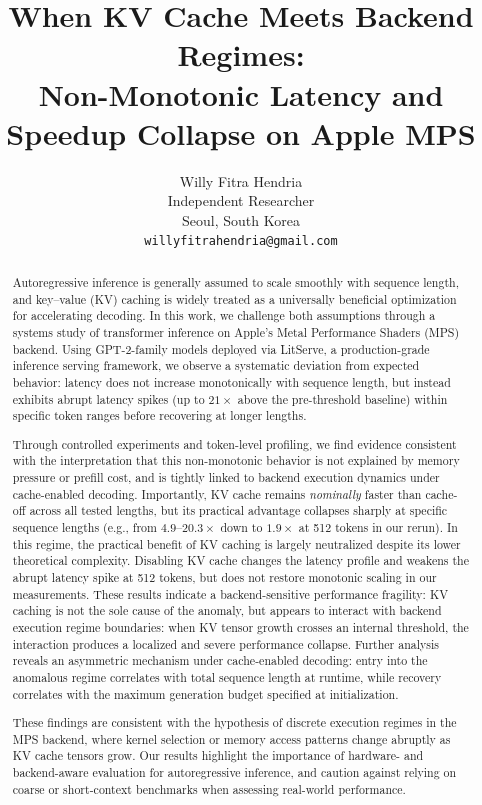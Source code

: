 \documentclass{article}
\title{When KV Cache Meets Backend Regimes: \\ Non-Monotonic Latency and Speedup Collapse on Apple MPS}
\author{
  Willy Fitra Hendria \\
  Independent Researcher \\
  Seoul, South Korea \\
  \texttt{willyfitrahendria@gmail.com}
}
\begin{document}
\maketitle

\begin{abstract}
Autoregressive inference is generally assumed to scale smoothly with sequence length, and key--value (KV) caching is widely treated as a universally beneficial optimization for accelerating decoding. In this work, we challenge both assumptions through a systems study of transformer inference on Apple's Metal Performance Shaders (MPS) backend. Using GPT-2-family models deployed via LitServe, a production-grade inference serving framework, we observe a systematic deviation from expected behavior: latency does not increase monotonically with sequence length, but instead exhibits abrupt latency spikes (up to $21\times$ above the pre-threshold baseline) within specific token ranges before recovering at longer lengths.

Through controlled experiments and token-level profiling, we find evidence consistent with the interpretation that this non-monotonic behavior is not explained by memory pressure or prefill cost, and is tightly linked to backend execution dynamics under cache-enabled decoding. Importantly, KV cache remains \emph{nominally} faster than cache-off across all tested lengths, but its practical advantage collapses sharply at specific sequence lengths (e.g., from $4.9$--$20.3\times$ down to $1.9\times$ at 512 tokens in our rerun). In this regime, the practical benefit of KV caching is largely neutralized despite its lower theoretical complexity. Disabling KV cache changes the latency profile and weakens the abrupt latency spike at 512 tokens, but does not restore monotonic scaling in our measurements. These results indicate a backend-sensitive performance fragility: KV caching is not the sole cause of the anomaly, but appears to interact with backend execution regime boundaries: when KV tensor growth crosses an internal threshold, the interaction produces a localized and severe performance collapse. Further analysis reveals an asymmetric mechanism under cache-enabled decoding: entry into the anomalous regime correlates with total sequence length at runtime, while recovery correlates with the maximum generation budget specified at initialization.

These findings are consistent with the hypothesis of discrete execution regimes in the MPS backend, where kernel selection or memory access patterns change abruptly as KV cache tensors grow. Our results highlight the importance of hardware- and backend-aware evaluation for autoregressive inference, and caution against relying on coarse or short-context benchmarks when assessing real-world performance.
\end{abstract}
\end{document}

